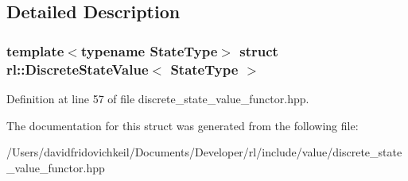 \subsection{Detailed Description}
\subsubsection*{template$<$typename State\+Type$>$\newline
struct rl\+::\+Discrete\+State\+Value$<$ State\+Type $>$}



Definition at line 57 of file discrete\+\_\+state\+\_\+value\+\_\+functor.\+hpp.



The documentation for this struct was generated from the following file\+:\begin{DoxyCompactItemize}
\item 
/\+Users/davidfridovichkeil/\+Documents/\+Developer/rl/include/value/discrete\+\_\+state\+\_\+value\+\_\+functor.\+hpp\end{DoxyCompactItemize}
